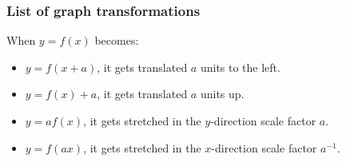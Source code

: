 \subsubsection{List of graph transformations}
When $y=f(x)$ becomes:
\begin{itemize}
	\item $y=f(x+a)$, it gets translated $a$ units to the left.
	\item $y=f(x)+a$, it gets translated $a$ units up.
	\item $y=af(x)$, it gets stretched in the $y$-direction scale factor $a$.
	\item $y=f(ax)$, it gets stretched in the $x$-direction scale factor $a^{-1}$.
\end{itemize}

